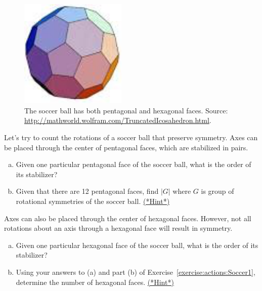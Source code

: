 \begin{figure}[ht]
\begin{center}
\includegraphics[width=2in]{images/Soccerball.png}
\caption{The soccer ball has both pentagonal and  hexagonal faces.  Source: \url{http://mathworld.wolfram.com/TruncatedIcosahedron.html}.
}
\label{fig:Soccer}
\end{center}
\end{figure}

Let's try to count the rotations of a soccer ball that preserve symmetry.  Axes can be placed through the center of pentagonal faces, which are stabilized in pairs. 

\begin{exercise}\label{exercise:actions:Soccer1}
\begin{enumerate}[(a)]
\item
Given one particular pentagonal face of the soccer ball, what is the order of its stabilizer?
\item
Given that there are 12 pentagonal faces, find $|G|$ where $G$ is  group of rotational symmetries of the soccer ball.
\hyperref[sec:actions:hints]{(*Hint*)}
\end{enumerate}
\end{exercise}

 Axes can also be placed through the center of hexagonal faces.  However, not all rotations about an axis through a hexagonal face will result in symmetry.

\begin{exercise}\label{exercise:actions:Soccer2}
\begin{enumerate}[(a)]
\item
Given one particular hexagonal face of the soccer ball, what is the order of its stabilizer?
\item
Using your answers to (a) and part (b) of Exercise~\ref{exercise:actions:Soccer1}, determine the number of hexagonal faces. \hyperref[sec:actions:hints]{(*Hint*)}
\end{enumerate}
\end{exercise}

